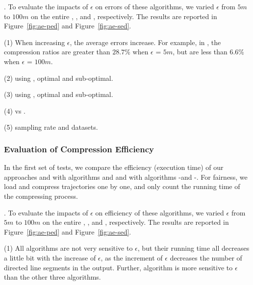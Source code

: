 .
To evaluate the impacts of $\epsilon$ on errors of these algorithms, we varied $\epsilon$ from $5m$ to $100m$ on the entire \taxi, \truck, \ucar and \geolife, respectively.
The results are reported in Figure~\ref{fig:ae-ped} and Figure~\ref{fig:ae-sed}.

\sstab (1) When increasing $\epsilon$, the average errors increase. For example, in \ucar,
the compression ratios are greater than $28.7\%$ when $\epsilon$ = $5m$, but are less than $6.6\%$ when $\epsilon$ = $100m$.

\sstab (2) using \ped, optimal and sub-optimal.

\sstab (3) using \sed, optimal and sub-optimal.

\sstab (4) \ped vs \sed.

\sstab (5) sampling rate and datasets.



\subsubsection{Evaluation of Compression Efficiency}




In the first set of tests, we compare the efficiency (execution time) of our approaches \operb and \operba with algorithms \dpa and \fbqsa
and with algorithms -\operb and -\operba.
For fairness, we load and compress trajectories one by one, and only count the running time of the compressing process.

.
To evaluate the impacts of $\epsilon$ on efficiency of these algorithms, we varied $\epsilon$ from $5m$ to $100m$ on the entire \taxi, \truck, \ucar and \geolife, respectively.
The results are reported in Figure~\ref{fig:ae-ped} and Figure~\ref{fig:ae-sed}.

\sstab (1) 
All algorithms are not very sensitive to $\epsilon$, but their running time all decreases a little bit with the increase of $\epsilon$,
as the increment of $\epsilon$ decreases the number of directed line segments in the output.
Further, algorithm \dpa is more sensitive to $\epsilon$ than the other three algorithms.

